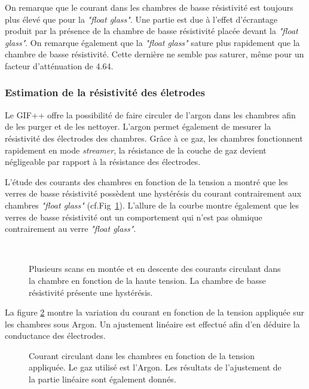 On remarque que le courant dans les chambres de basse résistivité est toujours plus élevé que pour la \textit{"float glass"}. Une partie est due à l'effet d'écrantage produit par la présence de la chambre de basse résistivité placée devant la \textit{"float glass"}. On remarque également que la \textit{"float glass"} sature plus rapidement que la chambre de basse résistivité. Cette dernière ne semble pas saturer, même pour un facteur d'atténuation de \num{4.64}.

\subsubsection{Estimation de la résistivité des életrodes}

Le GIF++ offre la possibilité de faire circuler de l'argon dans les chambres afin de les purger et de les nettoyer. L'argon permet également de mesurer la résistivité des électrodes des chambres. Grâce à ce gaz, les chambres fonctionnent rapidement en mode \textit{streamer}, la résistance de la couche de gaz devient négligeable  par rapport à la résistance des électrodes. 

L'étude des courants des chambres en fonction de la tension a montré que les verres de basse résistivité possèdent une hystérésis du courant contrairement aux chambres \textit{"float glass"} (cf.Fig~\ref{hysteresis}). L'allure de la courbe montre également que les verres de basse résistivité ont un comportement qui n'est pas ohmique contrairement au verre \textit{"float glass"}.


\begin{figure}[ht!]
	\centering
	\\
	\caption{Plusieurs scans en montée et en descente  des courants circulant dans la chambre en fonction de la haute tension. La chambre de basse résistivité présente une hystérésis.}
	\label{hysteresis}
\end{figure}


La figure \ref{ScanArgon} montre la variation du courant en fonction de la tension appliquée sur les chambres sous Argon. Un ajustement linéaire est effectué afin d'en déduire la conductance des électrodes.

\begin{figure}[!ht]
	\centering
	\caption{Courant circulant dans les chambres en fonction de la tension appliquée. Le gaz utilisé est l'Argon. Les résultats de l'ajustement de la partie linéaire sont également donnés.}
	\label{ScanArgon}
\end{figure}

